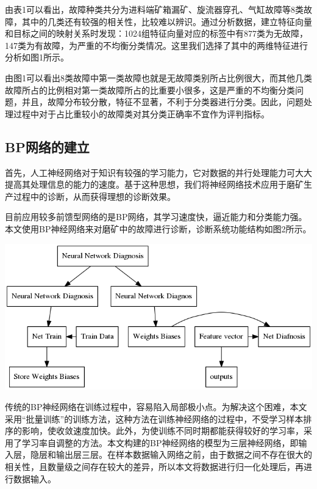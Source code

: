 \documentclass{ctacn}%
\begin{document}
\begin{multicols}{2}
由表1可以看出，故障种类共分为进料端矿箱漏矿、旋流器穿孔、气缸故障等8类故障，其中的几类还有较强的相关性，比较难以辨识。通过分析数据，建立特征向量和目标之间的映射关系时发现：1024组特征向量对应的标签中有877类为无故障，147类为有故障，为严重的不均衡分类情况。这里我们选择了其中的两维特征进行分析如图1所示。

由图1可以看出8类故障中第一类故障也就是无故障类别所占比例很大，而其他几类故障所占的比例相对第一类故障所占的比重要小很多，这是严重的不均衡分类问题，并且，故障分布较分散，特征不显著，不利于分类器进行分类。因此，问题处理过程中对于占比重较小的故障类对其分类正确率不宜作为评判指标。

\subsection{BP网络的建立}

首先，人工神经网络对于知识有较强的学习能力，它对数据的并行处理能力可大大提高其处理信息的能力的速度。基于这种思想，我们将神经网络技术应用于磨矿生产过程中的诊断，从而获得理想的诊断效果。

目前应用较多前馈型网络的是BP网络，其学习速度快，逼近能力和分类能力强。本文使用BP神经网络来对磨矿中的故障进行诊断，诊断系统功能结构如图2所示。

\begin{center}
	\includegraphics[scale=0.12, trim=0 0 0 0]{figs/procedure}
	\label{fig2}
\end{center}

传统的BP神经网络在训练过程中，容易陷入局部极小点。为解决这个困难，本文采用“批量训练”的训练方法，这种方法在训练神经网络的过程中，不受学习样本排序的影响，使收敛速度加快。此外，为使训练不同时期都能获得较好的学习率，采用了学习率自调整的方法。本文构建的BP神经网络的模型为三层神经网络，即输入层，隐层和输出层三层。在样本数据输入网络之前，由于数据之间不存在很大的相关性，且数量级之间存在较大的差异，所以本文将数据进行归一化处理后，再进行数据输入。


\end{multicols}
\end{document}
